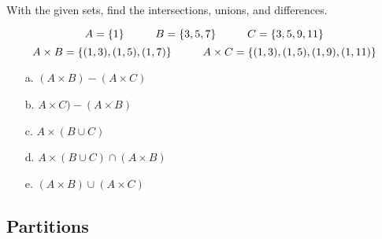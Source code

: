 \documentclass[a4paper,12pt]{book}
\newcounter{question}
\begin{document}
        \begin{questionNOGRADE}{\thequestion}

            With the given sets, find the intersections, unions, and differences.

            $$ A = \{1\} \hspace*{1cm} B = \{3, 5, 7\} \hspace*{1cm} C = \{3, 5, 9, 11\} $$
            $$ A \times B = \{ (1, 3), (1, 5), (1, 7) \} \hspace*{1cm}{}
                A \times C = \{ (1, 3), (1, 5), (1, 9), (1, 11) \} $$

            \begin{enumerate}
                \item[a.]   $(A \times B) - (A \times C)$
                    \solution{}{ { ~\\ \raisebox{0pt}[1cm][0pt]{  } } }

                \item[b.]   $A \times C) - (A \times B)$
                    \solution{}{ { ~\\ \raisebox{0pt}[1cm][0pt]{  } } }

                \item[c.]   $A \times (B \cup C)$
                    \solution{}{ { ~\\ \raisebox{0pt}[1cm][0pt]{  } } }

                \item[d.]   $A \times (B \cup C) \cap (A \times B)$
                    \solution{}{ { ~\\ \raisebox{0pt}[1cm][0pt]{  } } }

                \item[e.]   $(A \times B) \cup (A \times C)$
                    \solution{}{ { ~\\ \raisebox{0pt}[1cm][0pt]{  } } }
            \end{enumerate}

        \end{questionNOGRADE}

    \newpage
    
    \subsection{Partitions}
\end{document}
